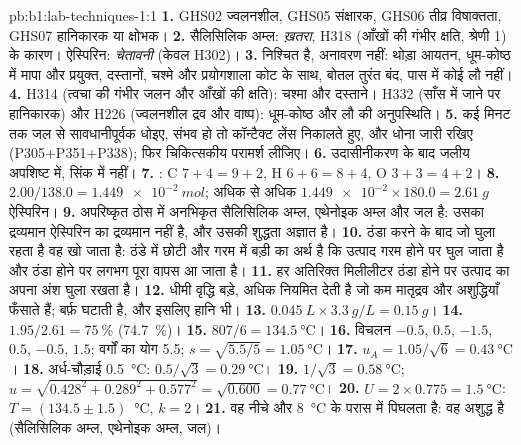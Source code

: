 \begin{solution}{pb:b1:lab-techniques-1:1}
\textbf{1.} GHS02 ज्वलनशील, GHS05 संक्षारक, GHS06 तीव्र विषाक्तता, GHS07
हानिकारक या क्षोभक।
\textbf{2.} सैलिसिलिक अम्ल: \emph{ख़तरा}, H318 (आँखों की गंभीर
क्षति, श्रेणी 1) के कारण। ऐस्पिरिन: \emph{चेतावनी} (केवल H302)।
\textbf{3.}  निश्चित है, अनावरण नहीं: थोड़ा आयतन,
धूम-कोष्ठ में मापा और प्रयुक्त, दस्तानों, चश्मे और प्रयोगशाला कोट के साथ,
बोतल तुरंत बंद, पास में कोई लौ नहीं।
\textbf{4.} H314 (त्वचा की गंभीर जलन और आँखों की क्षति): चश्मा और दस्ताने।
H332 (साँस में जाने पर हानिकारक) और H226 (ज्वलनशील द्रव और वाष्प): धूम-कोष्ठ
और लौ की अनुपस्थिति।
\textbf{5.} कई मिनट तक जल से सावधानीपूर्वक धोइए, संभव हो तो
कॉन्टैक्ट लेंस निकालते हुए, और धोना जारी रखिए (P305+P351+P338); फिर
चिकित्सकीय परामर्श लीजिए।
\textbf{6.} उदासीनीकरण के बाद जलीय अपशिष्ट में, सिंक में
नहीं।
\textbf{7.} : C $7 + 4 = 9 + 2$,
H $6 + 6 = 8 + 4$, O $3 + 3 = 4 + 2$।
\textbf{8.} $2.00/138.0 = \qty{1.449e-2}{mol}$; अधिक से अधिक
$\num{1.449e-2} \times 180.0 = \qty{2.61}{g}$ ऐस्पिरिन।
\textbf{9.} अपरिष्कृत ठोस में अनभिकृत सैलिसिलिक अम्ल, एथेनोइक
अम्ल और जल है: उसका द्रव्यमान ऐस्पिरिन का द्रव्यमान नहीं है, और उसकी शुद्धता
अज्ञात है।
\textbf{10.} ठंडा करने के बाद जो घुला रहता है वह खो जाता है: ठंडे में छोटी
और गरम में बड़ी  का अर्थ है कि उत्पाद गरम होने पर घुल जाता है और ठंडा होने पर
लगभग पूरा वापस आ जाता है।
\textbf{11.} हर अतिरिक्त मिलीलीटर ठंडा होने पर उत्पाद का अपना अंश
घुला रखता है।
\textbf{12.} धीमी वृद्धि बड़े, अधिक नियमित  देती है जो कम
मातृद्रव और अशुद्धियाँ फँसाते हैं; बर्फ़  घटाती है, और इसलिए
हानि भी।
\textbf{13.} $\qty{0.045}{L} \times \qty{3.3}{g/L} = \qty{0.15}{g}$।
\textbf{14.} $1.95/2.61 = \qty{75}{\percent}$ (\qty{74.7}{\percent})।
\textbf{15.} $807/6 = \qty{134.5}{\celsius}$।
\textbf{16.} विचलन $-0.5$, $0.5$, $-1.5$, $0.5$, $-0.5$, $1.5$; वर्गों का
योग 5.5; $s = \sqrt{5.5/5} = \qty{1.05}{\celsius}$।
\textbf{17.} $u_A = 1.05/\sqrt6 = \qty{0.43}{\celsius}$।
\textbf{18.} अर्ध-चौड़ाई \qty{0.5}{\celsius}: $0.5/\sqrt3 = \qty{0.29}{\celsius}$।
\textbf{19.} $1/\sqrt3 = \qty{0.58}{\celsius}$;
$u = \sqrt{0.428^2 + 0.289^2 + 0.577^2} = \sqrt{0.600} = \qty{0.77}{\celsius}$।
\textbf{20.} $U = 2 \times 0.775 = \qty{1.5}{\celsius}$:
$T = (134.5 \pm 1.5)$~\unit{\celsius}, $k = 2$।
\textbf{21.} वह नीचे और \qty{8}{\celsius} के परास में पिघलता है: वह
अशुद्ध है (सैलिसिलिक अम्ल, एथेनोइक अम्ल, जल)।

\end{solution}

